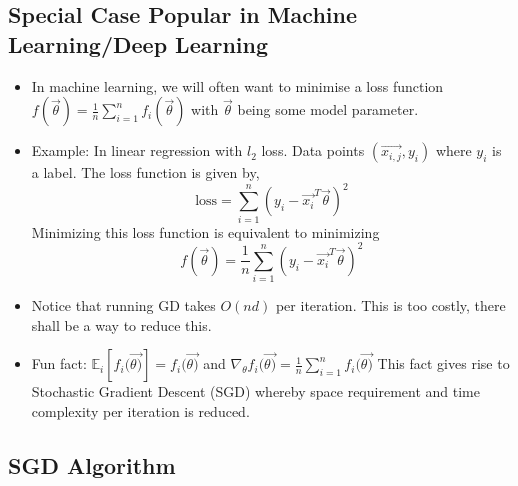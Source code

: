 \documentclass[12pt]{article}
\begin{document}
\subsection{Special Case Popular in Machine Learning/Deep Learning}
\begin{itemize}
	\item In machine learning, we will often want to minimise a loss function $f(\vec{\theta}) = \frac{1}{n} \sum_{i=1}^{n} f_i(\vec{\theta})$ with $\vec{\theta}$ being some model parameter.
	\item Example: In linear regression with $l_2$ loss. Data points $(\vec{x_{i,j}},y_i)$ where $y_i$ is a label. The loss function is given by, 
	$$
	\text{loss} =\sum_{i=1}^{n} (y_i - \vec{x_i}^T \vec{\theta})^2
	$$
	Minimizing this loss function is equivalent to minimizing 
	$$
	f(\vec{\theta})= \frac{1}{n}\sum_{i=1}^{n} (y_i - \vec{x_i}^T \vec{\theta})^2
	$$ 
	\item Notice that running GD takes $O(nd)$ per iteration. This is too costly, there shall be a way to reduce this.
	\item Fun fact: $\mathbb{E}_i [f_i(\vec{\theta)}] = f_i(\vec{\theta)}$ and $\nabla_{\theta} f_i(\vec{\theta)} = \frac{1}{n}\sum_{i=1}^{n} f_i(\vec{\theta)}$
	This fact gives rise to Stochastic Gradient Descent (SGD) whereby space requirement and time complexity per iteration is reduced. 
\end{itemize}

\subsection{SGD Algorithm}
\end{document}
